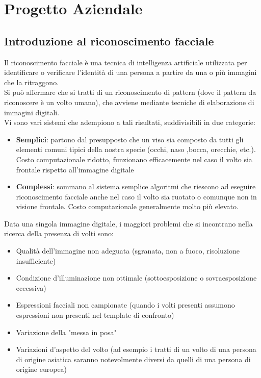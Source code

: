 
\chapter{Progetto Aziendale} %

\label{Chapter2} %



\section{Introduzione al riconoscimento facciale}

Il riconoscimento facciale è una tecnica di intelligenza artificiale utilizzata per identificare o verificare l'identità di una persona a partire da una o più immagini che la ritraggono.\\
Si può affermare che si tratti di un riconoscimento di pattern (dove il pattern da riconoscere è un volto umano), che avviene mediante tecniche di elaborazione di immagini digitali.\\Vi sono vari sistemi che adempiono a tali risultati, suddivisibili in due categorie:

\begin{itemize}
  \item \textbf{Semplici}: partono dal presupposto che un viso sia composto da tutti gli elementi comuni tipici della nostra specie (occhi, naso ,bocca, orecchie, etc.). Costo computazionale ridotto, funzionano efficacemente nel caso il volto sia frontale rispetto all'immagine digitale
  \item \textbf{Complessi}: sommano al sistema semplice algoritmi che riescono ad eseguire riconoscimento facciale anche nel caso il volto sia ruotato o comunque non in visione frontale. Costo computazionale generalmente molto più elevato. 
\end{itemize}

Data una singola immagine digitale, i maggiori problemi che si incontrano nella ricerca della presenza di volti sono:

\begin{itemize}
\item Qualità dell'immagine non adeguata (sgranata, non a fuoco, risoluzione insufficiente)
\item Condizione d'illuminazione non ottimale (sottoesposizione o sovraesposizione eccessiva)
\item Espressioni facciali non campionate (quando i volti presenti assumono espressioni non presenti nel template di confronto)
\item Variazione della "messa in posa"
\item Variazioni d'aspetto del volto (ad esempio i tratti di un volto di una persona di origine asiatica saranno notevolmente diversi da quelli di una persona di origine europea)
\end{itemize}

